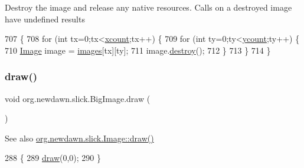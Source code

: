 Destroy the image and release any native resources. Calls on a destroyed image have undefined results 
\begin{DoxyCode}
707                                                 \{
708         \textcolor{keywordflow}{for} (\textcolor{keywordtype}{int} tx=0;tx<\mbox{\hyperlink{classorg_1_1newdawn_1_1slick_1_1_big_image_ae42c6b98e3a7924bf005b1b356cca4c2}{xcount}};tx++) \{
709             \textcolor{keywordflow}{for} (\textcolor{keywordtype}{int} ty=0;ty<\mbox{\hyperlink{classorg_1_1newdawn_1_1slick_1_1_big_image_a699c6b87723d356a7062f79c35c6be5a}{ycount}};ty++) \{
710                 \mbox{\hyperlink{classorg_1_1newdawn_1_1slick_1_1_image_a2c047fa669a8387f6c2d9bde33b3ee04}{Image}} image = \mbox{\hyperlink{classorg_1_1newdawn_1_1slick_1_1_big_image_a297fc524b2aef82e75e23a59c6f4102f}{images}}[tx][ty];
711                 image.\mbox{\hyperlink{classorg_1_1newdawn_1_1slick_1_1_image_a416abf7b7608e27ad903388f2b2bfb38}{destroy}}();
712             \}
713         \}
714     \}
\end{DoxyCode}
\mbox{\label{classorg_1_1newdawn_1_1slick_1_1_big_image_a75b5b008adf93b038aa56e9cfefd1a1c}} 
\subsubsection{\texorpdfstring{draw()}{draw()}\hspace{0.1cm}{\footnotesize\ttfamily [1/10]}}
{\footnotesize\ttfamily void org.\+newdawn.\+slick.\+Big\+Image.\+draw (\begin{DoxyParamCaption}{ }\end{DoxyParamCaption})\hspace{0.3cm}{\ttfamily [inline]}}

\begin{DoxySeeAlso}{See also}
\mbox{\hyperlink{classorg_1_1newdawn_1_1slick_1_1_image_a9bddcca05c7140ab45df8ac5b250b6cd}{org.\+newdawn.\+slick.\+Image\+::draw()}} 
\end{DoxySeeAlso}

\begin{DoxyCode}
288                        \{
289         \mbox{\hyperlink{classorg_1_1newdawn_1_1slick_1_1_big_image_a75b5b008adf93b038aa56e9cfefd1a1c}{draw}}(0,0);
290     \}
\end{DoxyCode}
\mbox{\label{classorg_1_1newdawn_1_1slick_1_1_big_image_a9d8d3cd60f080ca6dd768d9ed372d55a}} 
